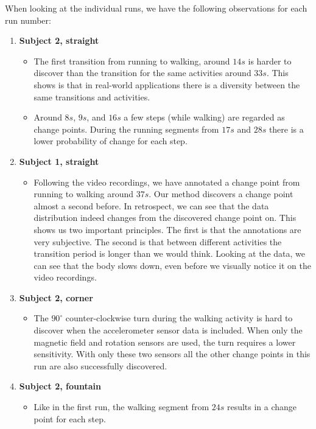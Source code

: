 
When looking at the individual runs, we have the following observations for each run number:
\begin{enumerate}
  \item \textbf{Subject 2, straight}
    \begin{itemize}
      \item The first transition from running to walking, around $14s$ is harder to discover than the transition for the same activities around $33s$.
      This shows is that in real-world applications there is a diversity between the same transitions and activities.
      \item Around $8s$, $9s$, and $16s$ a few steps (while walking) are regarded as change points.
      During the running segments from $17s$ and $28s$ there is a lower probability of change for each step.
    \end{itemize}
  \item \textbf{Subject 1, straight}
    \begin{itemize}
      \item Following the video recordings, we have annotated a change point from running to walking around $37s$.
      Our method discovers a change point almost a second before.
      In retrospect, we can see that the data distribution indeed changes from the discovered change point on.
      This shows us two important principles.
      The first is that the annotations are very subjective.
      The second is that between different activities the transition period is longer than we would think.
      Looking at the data, we can see that the body slows down, even before we visually notice it on the video recordings.
    \end{itemize}
  \item \textbf{Subject 2, corner}
    \begin{itemize}
      \item The $90^{\circ}$ counter-clockwise turn during the walking activity is hard to discover when the accelerometer sensor data is included.
      When only the magnetic field and rotation sensors are used, the turn requires a lower sensitivity.
      With only these two sensors all the other change points in this run are also successfully discovered.
    \end{itemize}
  \item \textbf{Subject 2, fountain}
    \begin{itemize}
      \item Like in the first run, the walking segment from $24s$ results in a change point for each step.

\end{itemize}
\end{enumerate}

